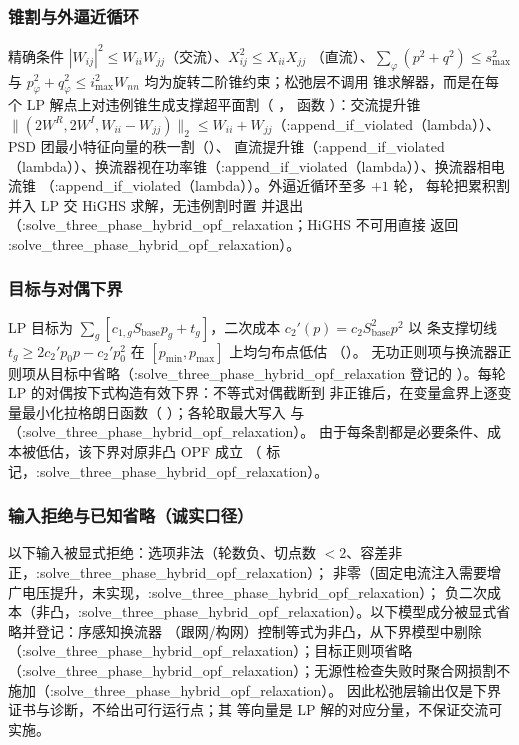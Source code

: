 \subsubsection*{锥割与外逼近循环}
精确条件 $|W_{ij}|^2\le W_{ii}W_{jj}$（交流）、$X_{ij}^2\le X_{ii}X_{jj}$
（直流）、$\sum_\varphi(p^2+q^2)\le s_{\max}^2$ 与
$p_\varphi^2+q_\varphi^2\le i_{\max}^2 W_{nn}$ 均为旋转二阶锥约束；松弛层不调用
锥求解器，而是在每个 LP 解点上对违例锥生成支撑超平面割（
，
函数 ）：交流提升锥
$\lVert(2W^{R},2W^{I},W_{ii}-W_{jj})\rVert_2\le W_{ii}+W_{jj}$（:append\_if\_violated（lambda））、
PSD 团最小特征向量的秩一割（）、
直流提升锥（:append\_if\_violated（lambda））、换流器视在功率锥（:append\_if\_violated（lambda））、换流器相电流锥
（:append\_if\_violated（lambda））。外逼近循环至多 $+1$ 轮，
每轮把累积割并入 LP 交 HiGHS 求解，无违例割时置
 并退出（:solve\_three\_phase\_hybrid\_opf\_relaxation；HiGHS 不可用直接
返回 :solve\_three\_phase\_hybrid\_opf\_relaxation）。

\subsubsection*{目标与对偶下界}
LP 目标为 $\sum_g[c_{1,g}S_{\mathrm{base}}p_g + t_g]$，二次成本
$c_2'(p)=c_2S_{\mathrm{base}}^2p^2$ 以  条支撑切线
$t_g\ge 2c_2'p_0p-c_2'p_0^2$ 在 $[p_{\min},p_{\max}]$ 上均匀布点低估
（）。
无功正则项与换流器正则项从目标中省略（:solve\_three\_phase\_hybrid\_opf\_relaxation 登记的
）。每轮 LP 的对偶按下式构造有效下界：不等式对偶截断到
非正锥后，在变量盒界上逐变量最小化拉格朗日函数（
）；各轮取最大写入
 与 （:solve\_three\_phase\_hybrid\_opf\_relaxation）。
由于每条割都是必要条件、成本被低估，该下界对原非凸 OPF 成立
（ 标记，:solve\_three\_phase\_hybrid\_opf\_relaxation）。

\subsubsection*{输入拒绝与已知省略（诚实口径）}
以下输入被显式拒绝：选项非法（轮数负、切点数 $<2$、容差非正，:solve\_three\_phase\_hybrid\_opf\_relaxation）；
 非零（固定电流注入需要增广电压提升，未实现，:solve\_three\_phase\_hybrid\_opf\_relaxation）；
负二次成本（非凸，:solve\_three\_phase\_hybrid\_opf\_relaxation）。以下模型成分被显式省略并登记：序感知换流器
（跟网/构网）控制等式为非凸，从下界模型中剔除（:solve\_three\_phase\_hybrid\_opf\_relaxation）；目标正则项省略
（:solve\_three\_phase\_hybrid\_opf\_relaxation）；无源性检查失败时聚合网损割不施加（:solve\_three\_phase\_hybrid\_opf\_relaxation）。
因此松弛层输出仅是下界证书与诊断，不给出可行运行点；其
 等向量是 LP 解的对应分量，不保证交流可实施。

